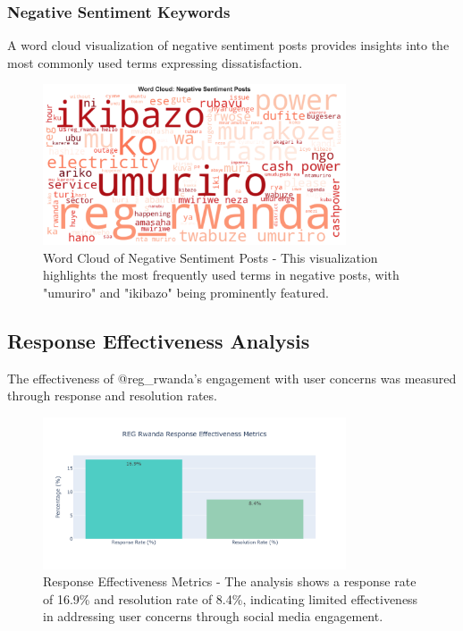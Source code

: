 \documentclass[a4paper,12pt]{article}
\begin{document}
	\subsubsection{Negative Sentiment Keywords}
	A word cloud visualization of negative sentiment posts provides insights into the most commonly used terms expressing dissatisfaction.
	
	\begin{figure}[H]
		\centering
		\includegraphics[width=0.8\textwidth]{../results/negative_wordcloud.png}
		\caption{Word Cloud of Negative Sentiment Posts - This visualization highlights the most frequently used terms in negative posts, with "umuriro" and "ikibazo" being prominently featured.}
		\label{fig:wordcloud}
	\end{figure}
	
	\subsection{Response Effectiveness Analysis}
	The effectiveness of @reg\_rwanda's engagement with user concerns was measured through response and resolution rates.
	
	\begin{figure}[H]
		\centering
		\includegraphics[width=0.8\textwidth]{../results/response_effectiveness.png}
		\caption{Response Effectiveness Metrics - The analysis shows a response rate of 16.9\% and resolution rate of 8.4\%, indicating limited effectiveness in addressing user concerns through social media engagement.}
		\label{fig:effectiveness}
	\end{figure}
	
\end{document}
